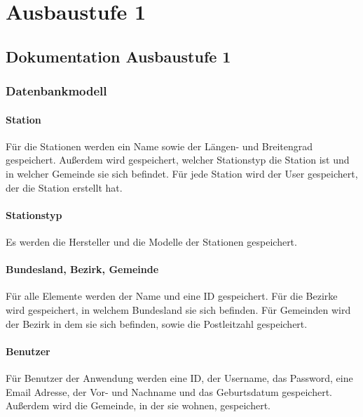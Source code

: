 \chapter{Ausbaustufe 1}

\section{Dokumentation Ausbaustufe
1}\label{dokumentation-ausbaustufe-1}


\subsection{Datenbankmodell}\label{datenbankmodell}

\subsubsection{Station}\label{station}

Für die Stationen werden ein Name sowie der Längen- und Breitengrad gespeichert. Außerdem wird gespeichert, welcher Stationstyp die Station ist und in welcher Gemeinde sie sich befindet. Für jede Station wird der User gespeichert, der die Station erstellt hat.


\subsubsection{Stationstyp}\label{stationstyp}

Es werden die Hersteller und die Modelle der Stationen gespeichert.


\subsubsection{Bundesland, Bezirk,
Gemeinde}\label{bundesland-bezirk-gemeinde}

Für alle Elemente werden der Name und eine ID gespeichert. Für die
Bezirke wird gespeichert, in welchem Bundesland sie sich befinden. Für
Gemeinden wird der Bezirk in dem sie sich befinden, sowie die
Postleitzahl gespeichert.

\subsubsection{Benutzer}\label{benutzer}

Für Benutzer der Anwendung werden eine ID, der Username, das Password,
eine Email Adresse, der Vor- und Nachname und das Geburtsdatum
gespeichert. Außerdem wird die Gemeinde, in der sie wohnen, gespeichert.


